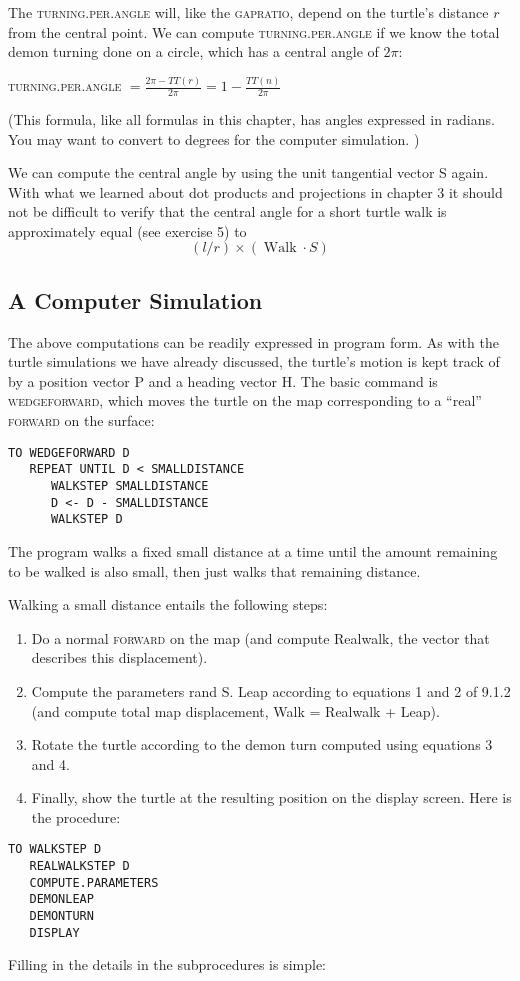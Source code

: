 \documentclass{book}
\begin{document}
The \textsc{turning}\textsc{.per}\textsc{.angle} will, like the \textsc{gapratio}, depend on the turtle's
distance $r$ from the central point. We can compute \textsc{turning}\textsc{.per}\textsc{.angle}
if we know the total demon turning done on a circle, which has a central
angle of $2 \pi$:

\textsc{turning}\textsc{.per}\textsc{.angle} $= \frac {2 \pi - TT(r)} {2 \pi} = 1 - \frac {TT(n)} {2 \pi} $

(This formula, like all formulas in this chapter, has angles expressed
in radians. You may want to convert to degrees for the computer
simulation. )

We can compute the central angle by using the unit tangential vector
S again. With what we learned about dot products and projections in
chapter 3 it should not be difficult to verify that the central angle for a
short turtle walk is approximately equal (see exercise 5) to
$$(l/r) \times (\operatorname{Walk} \cdot S)$$

\subsection{A Computer Simulation}

The above computations can be readily expressed in program form. As
with the turtle simulations we have already discussed, the turtle's motion
is kept track of by a position vector P and a heading vector H. The
basic command is \textsc{wedgeforward}, which moves the turtle on the map
corresponding to a ``real'' \textsc{forward} on the surface:

\begin{verbatim}
TO WEDGEFORWARD D
   REPEAT UNTIL D < SMALLDISTANCE
      WALKSTEP SMALLDISTANCE
      D <- D - SMALLDISTANCE
      WALKSTEP D
\end{verbatim}
The program walks a fixed small distance at a time until the amount
remaining to be walked is also small, then just walks that remaining
distance.

Walking a small distance entails the following steps:
\begin{enumerate}
\item Do a normal \textsc{forward} on the map (and compute Realwalk, the vector
that describes this displacement).

\item Compute the parameters rand S. Leap according to equations 1 and
2 of 9.1.2 (and compute total map displacement, Walk = Realwalk +
Leap).

\item Rotate the turtle according to the demon turn computed using equations 3 and 4.

\item Finally, show the turtle at the resulting position on the display screen.
Here is the procedure:
\end{enumerate}
\begin{verbatim}
TO WALKSTEP D
   REALWALKSTEP D
   COMPUTE.PARAMETERS
   DEMONLEAP
   DEMONTURN
   DISPLAY
\end{verbatim}
Filling in the details in the subprocedures is simple:
\end{document}

